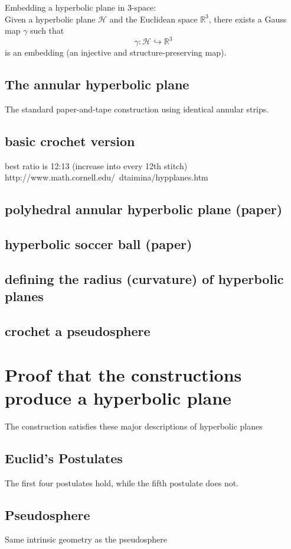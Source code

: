 \documentclass{article}
\begin{document}
Embedding a hyperbolic plane in 3-space:\\
Given a hyperbolic plane $\mathcal{H}$ and the Euclidean space $\mathbb{R}^3$, there exists a Gauss map $\gamma$ such that
\[ \gamma : \mathcal{H} \hookrightarrow \mathbb{R}^3 \]
is an embedding (an injective and structure-preserving map).

\subsection{The annular hyperbolic plane}
The standard paper-and-tape construction using identical annular strips.
\subsection{basic crochet version}
best ratio is 12:13 (increase into every 12th stitch) http://www.math.cornell.edu/~dtaimina/hypplanes.htm
\subsection{polyhedral annular hyperbolic plane (paper)}
\subsection{hyperbolic soccer ball (paper)}
\subsection{defining the radius (curvature) of hyperbolic planes}
\subsection{crochet a pseudosphere}

\section{Proof that the constructions produce a hyperbolic plane}
The construction satisfies these major descriptions of hyperbolic planes
\subsection{Euclid's Postulates}
The first four postulates hold, while the fifth postulate does not.
\subsection{Pseudosphere}
Same intrinsic geometry as the pseudosphere
\end{document}
